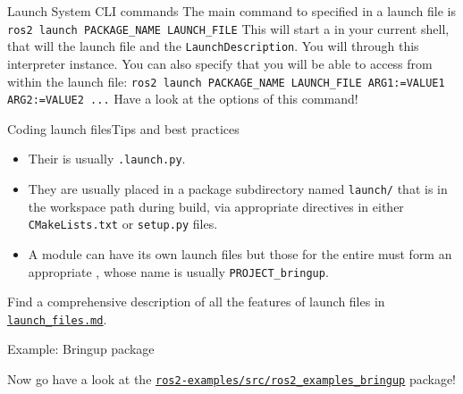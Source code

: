 \begin{frame}{Launch System CLI commands}
  The main command to  specified in a launch file is
  \newline\newline
  \texttt{ros2 launch PACKAGE\_NAME LAUNCH\_FILE}
  \newline\newline
  This will start a  in your current shell, that will  the launch file and  the \texttt{LaunchDescription}. You will  through this interpreter instance. You can also specify  that you will be able to access from within the launch file:
  \newline\newline
  \texttt{ros2 launch PACKAGE\_NAME LAUNCH\_FILE ARG1:=VALUE1 ARG2:=VALUE2 ...}
  \newline\newline
  Have a look at the options of this command!
\end{frame}

\begin{frame}{Coding launch files}{Tips and best practices}
	\begin{itemize}
		\item Their  is usually \texttt{.launch.py}.
		\item They are usually placed in a package subdirectory named \texttt{launch/} that is  in the workspace path during build, via appropriate directives in either \texttt{CMakeLists.txt} or \texttt{setup.py} files.
		\item A module can have its own launch files but those for the entire  must form an appropriate , whose name is usually \texttt{PROJECT\_bringup}.
	\end{itemize}
	\begin{block}{}
		\centering
		Find a comprehensive description of all the features of launch files in \href{https://github.com/IntelligentSystemsLabUTV/ros2-examples/blob/humble/launch_files.md}{\color{blue}\underline{\texttt{launch\_files.md}}}.
	\end{block}
\end{frame}

\begin{frame}{Example: Bringup package}
  \begin{block}{}
    \centering
	  Now go have a look at the \href{https://github.com/IntelligentSystemsLabUTV/ros2-examples/tree/humble/src/ros2_examples_bringup}{\color{blue}\underline{\texttt{ros2-examples/src/ros2\_examples\_bringup}}} package!
  \end{block}
\end{frame}
